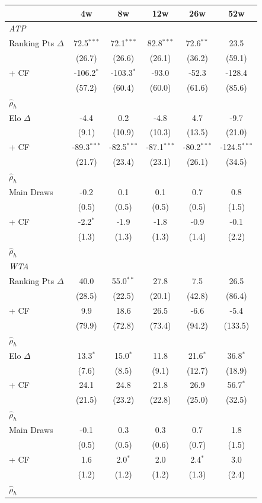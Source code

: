 \begin{tabular}{l*{5}{c}}
\toprule
 & 4w & 8w & 12w & 26w & 52w \\
\midrule
\multicolumn{6}{l}{\textit{ATP}} \\
  Ranking Pts $\Delta$ & 72.5$^{***}$ & 72.1$^{***}$ & 82.8$^{***}$ & 72.6$^{**}$ & 23.5 \\
  & (26.7) & (26.6) & (26.1) & (36.2) & (59.1) \\
  + CF & -106.2$^{*}$ & -103.3$^{*}$ & -93.0 & -52.3 & -128.4 \\
  & (57.2) & (60.4) & (60.0) & (61.6) & (85.6) \\
  $\hat{\rho}_h$ &  &  &  &  &  \\[0.3em]
  Elo $\Delta$ & -4.4 & 0.2 & -4.8 & 4.7 & -9.7 \\
  & (9.1) & (10.9) & (10.3) & (13.5) & (21.0) \\
  + CF & -89.3$^{***}$ & -82.5$^{***}$ & -87.1$^{***}$ & -80.2$^{***}$ & -124.5$^{***}$ \\
  & (21.7) & (23.4) & (23.1) & (26.1) & (34.5) \\
  $\hat{\rho}_h$ &  &  &  &  &  \\[0.3em]
  Main Draws & -0.2 & 0.1 & 0.1 & 0.7 & 0.8 \\
  & (0.5) & (0.5) & (0.5) & (0.5) & (1.5) \\
  + CF & -2.2$^{*}$ & -1.9 & -1.8 & -0.9 & -0.1 \\
  & (1.3) & (1.3) & (1.3) & (1.4) & (2.2) \\
  $\hat{\rho}_h$ &  &  &  &  &  \\[0.3em]
\midrule
\multicolumn{6}{l}{\textit{WTA}} \\
  Ranking Pts $\Delta$ & 40.0 & 55.0$^{**}$ & 27.8 & 7.5 & 26.5 \\
  & (28.5) & (22.5) & (20.1) & (42.8) & (86.4) \\
  + CF & 9.9 & 18.6 & 26.5 & -6.6 & -5.4 \\
  & (79.9) & (72.8) & (73.4) & (94.2) & (133.5) \\
  $\hat{\rho}_h$ &  &  &  &  &  \\[0.3em]
  Elo $\Delta$ & 13.3$^{*}$ & 15.0$^{*}$ & 11.8 & 21.6$^{*}$ & 36.8$^{*}$ \\
  & (7.6) & (8.5) & (9.1) & (12.7) & (18.9) \\
  + CF & 24.1 & 24.8 & 21.8 & 26.9 & 56.7$^{*}$ \\
  & (21.5) & (23.2) & (22.8) & (25.0) & (32.5) \\
  $\hat{\rho}_h$ &  &  &  &  &  \\[0.3em]
  Main Draws & -0.1 & 0.3 & 0.3 & 0.7 & 1.8 \\
  & (0.5) & (0.5) & (0.6) & (0.7) & (1.5) \\
  + CF & 1.6 & 2.0$^{*}$ & 2.0 & 2.4$^{*}$ & 3.0 \\
  & (1.2) & (1.2) & (1.2) & (1.3) & (2.4) \\
  $\hat{\rho}_h$ &  &  &  &  &  \\[0.3em]
\midrule
\bottomrule
\end{tabular}
